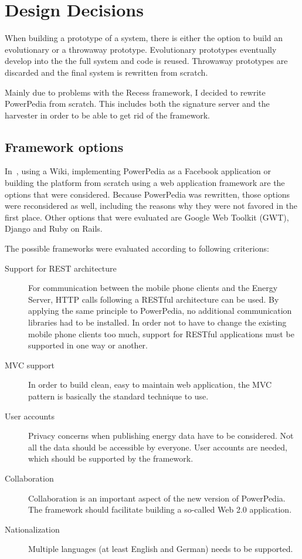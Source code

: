 \section{Design Decisions}
When building a prototype of a system, there is either the option to build an evolutionary or a throwaway prototype. Evolutionary prototypes eventually develop into the the full system \cite{interactive_systems} and code is reused. Throwaway prototypes are discarded and the final system is rewritten from scratch. 

Mainly due to problems with the Recess framework, I decided to rewrite PowerPedia from scratch. This includes both the signature server and the harvester in order to be able to get rid of the framework. 

\subsection{Framework options}
In~\cite{merklepp}, using a Wiki, implementing PowerPedia as a Facebook application or building the platform from scratch using a web application framework are the options that were considered. 
Because PowerPedia was rewritten, those options were reconsidered as well, including the reasons why they were not favored in the first place. Other options that were evaluated are Google Web Toolkit (GWT), Django and Ruby on Rails.  

The possible frameworks were evaluated according to following criterions:
\begin{description}
 \item[Support for REST architecture] For communication between the mobile phone clients and the Energy Server, HTTP calls following a RESTful architecture can be used. By applying the same principle to PowerPedia, no additional communication libraries had to be installed. In order not to have to change the existing mobile phone clients too much, support for RESTful applications must be supported in one way or another.
 \item[MVC support] In order to build clean, easy to maintain web application, the MVC pattern is basically the standard technique to use. 
 \item[User accounts] Privacy concerns when publishing energy data have to be considered. Not all the data should be accessible by everyone. User accounts are needed, which should be supported by the framework.
 \item[Collaboration] Collaboration is an important aspect of the new version of PowerPedia. The framework should facilitate building a so-called Web 2.0 application.
 \item[Nationalization] Multiple languages (at least English and German) needs to be supported.
\end{description}

